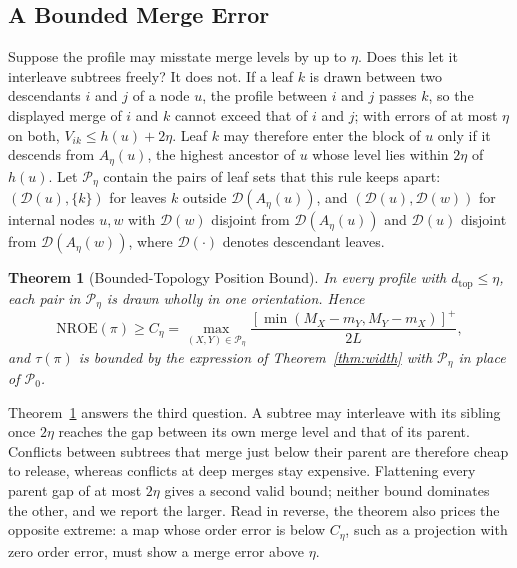 \documentclass[preprint]{vgtc}   %
\newtheorem{theorem}{Theorem}
\newcommand{\dtop}{d_{\mathrm{top}}}
\newcommand{\nroe}{\mathrm{NROE}}
\begin{document}
\subsection{A Bounded Merge Error}
Suppose the profile may misstate merge levels by up to $\eta$. Does this let it interleave subtrees freely? It does not. If a leaf $k$ is drawn between two descendants $i$ and $j$ of a node $u$, the profile between $i$ and $j$ passes $k$, so the displayed merge of $i$ and $k$ cannot exceed that of $i$ and $j$; with errors of at most $\eta$ on both, $V_{ik}\le h(u)+2\eta$. Leaf $k$ may therefore enter the block of $u$ only if it descends from $A_\eta(u)$, the highest ancestor of $u$ whose level lies within $2\eta$ of $h(u)$. Let $\mathcal{P}_\eta$ contain the pairs of leaf sets that this rule keeps apart: $(\mathcal{D}(u),\{k\})$ for leaves $k$ outside $\mathcal{D}(A_\eta(u))$, and $(\mathcal{D}(u),\mathcal{D}(w))$ for internal nodes $u,w$ with $\mathcal{D}(w)$ disjoint from $\mathcal{D}(A_\eta(u))$ and $\mathcal{D}(u)$ disjoint from $\mathcal{D}(A_\eta(w))$, where $\mathcal{D}(\cdot)$ denotes descendant leaves.
\begin{theorem}[Bounded-Topology Position Bound]\label{thm:chain}
In every profile with $\dtop\le\eta$, each pair in $\mathcal{P}_\eta$ is drawn wholly in one orientation. Hence
\begin{equation}\label{eq:chainbounds}
 \nroe(\pi)\ge C_\eta=\max_{(X,Y)\in\mathcal{P}_\eta}\frac{[\min(M_X-m_Y,M_Y-m_X)]^+}{2L},
\end{equation}
and $\tau(\pi)$ is bounded by the expression of Theorem~\ref{thm:width} with $\mathcal{P}_\eta$ in place of $\mathcal{P}_0$.
\end{theorem}
Theorem~\ref{thm:chain} answers the third question. A subtree may interleave with its sibling once $2\eta$ reaches the gap between its own merge level and that of its parent. Conflicts between subtrees that merge just below their parent are therefore cheap to release, whereas conflicts at deep merges stay expensive. Flattening every parent gap of at most $2\eta$ gives a second valid bound; neither bound dominates the other, and we report the larger. Read in reverse, the theorem also prices the opposite extreme: a map whose order error is below $C_\eta$, such as a projection with zero order error, must show a merge error above $\eta$.
\end{document}
